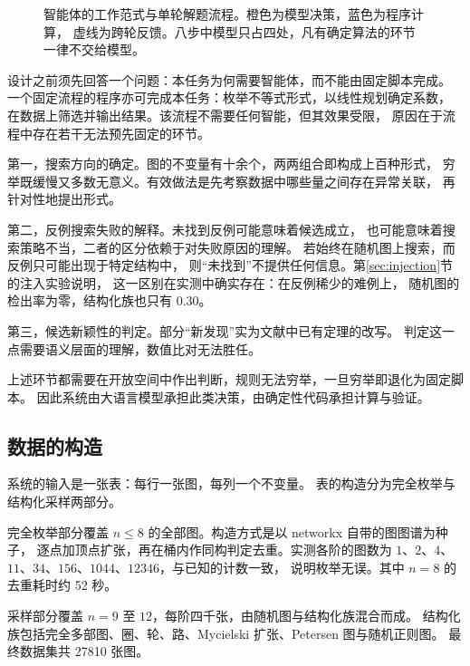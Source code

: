 \begin{figure}[H]
\caption{智能体的工作范式与单轮解题流程。橙色为模型决策，蓝色为程序计算，
虚线为跨轮反馈。八步中模型只占四处，凡有确定算法的环节一律不交给模型。}
\label{fig:loop}
\end{figure}

设计之前须先回答一个问题：本任务为何需要智能体，而不能由固定脚本完成。
一个固定流程的程序亦可完成本任务：枚举不等式形式，以线性规划确定系数，
在数据上筛选并输出结果。该流程不需要任何智能，但其效果受限，
原因在于流程中存在若干无法预先固定的环节。

第一，搜索方向的确定。图的不变量有十余个，两两组合即构成上百种形式，
穷举既缓慢又多数无意义。有效做法是先考察数据中哪些量之间存在异常关联，
再针对性地提出形式。

第二，反例搜索失败的解释。未找到反例可能意味着候选成立，
也可能意味着搜索策略不当，二者的区分依赖于对失败原因的理解。
若始终在随机图上搜索，而反例只可能出现于特定结构中，
则“未找到”不提供任何信息。第\ref{sec:injection}节的注入实验说明，
这一区别在实测中确实存在：在反例稀少的难例上，
随机图的检出率为零，结构化族也只有 0.30。

第三，候选新颖性的判定。部分“新发现”实为文献中已有定理的改写。
判定这一点需要语义层面的理解，数值比对无法胜任。

上述环节都需要在开放空间中作出判断，规则无法穷举，一旦穷举即退化为固定脚本。
因此系统由大语言模型承担此类决策，由确定性代码承担计算与验证。

\subsection{数据的构造}

系统的输入是一张表：每行一张图，每列一个不变量。
表的构造分为完全枚举与结构化采样两部分。

完全枚举部分覆盖 $n \leq 8$ 的全部图。构造方式是以 networkx 自带的图图谱为种子，
逐点加顶点扩张，再在桶内作同构判定去重。实测各阶的图数为
$1$、$2$、$4$、$11$、$34$、$156$、$1044$、$12346$，与已知的计数一致，
说明枚举无误。其中 $n=8$ 的去重耗时约 52 秒。

采样部分覆盖 $n=9$ 至 $12$，每阶四千张，由随机图与结构化族混合而成。
结构化族包括完全多部图、圈、轮、路、Mycielski 扩张、Petersen 图与随机正则图。
最终数据集共 27810 张图。

